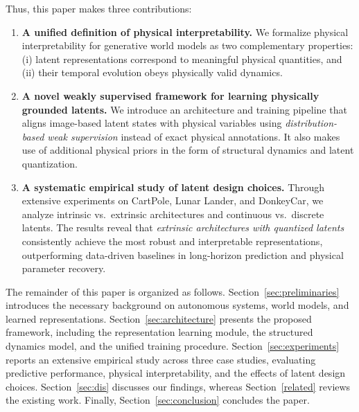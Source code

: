\documentclass[nonacm,sigconf]{acmart}
\begin{document}
Thus, this paper makes three contributions:
\begin{enumerate}
    \item \textbf{A unified definition of physical interpretability.}
    We formalize physical interpretability for generative world models as two complementary properties:
    (i) latent representations correspond to meaningful physical quantities, and
    (ii) their temporal evolution obeys physically valid dynamics.

    \item \textbf{A novel weakly supervised framework for learning physically grounded latents.}
    We introduce an architecture and training pipeline that aligns image-based latent states with physical variables using \emph{distribution-based weak supervision} instead of exact physical annotations. It also makes use of additional physical priors in the form of structural dynamics and latent quantization. %


    \item \textbf{A systematic empirical study of latent design choices.}
    Through extensive experiments on CartPole, Lunar Lander, and DonkeyCar, we analyze intrinsic vs.\ extrinsic architectures and continuous vs.\ discrete latents. The results reveal that \emph{extrinsic architectures with quantized latents} consistently achieve the most robust and interpretable representations, outperforming data-driven baselines in long-horizon prediction and physical parameter recovery.
\end{enumerate}

The remainder of this paper is organized as follows.
Section~\ref{sec:preliminaries} introduces the necessary background on autonomous systems, world models, and learned representations.
Section~\ref{sec:architecture} presents the proposed framework, including the representation learning module, the structured dynamics model, and the unified training procedure.
Section~\ref{sec:experiments} reports an extensive empirical study across three case studies, evaluating predictive performance, physical interpretability, and the effects of latent design choices. Section~\ref{sec:dis} discusses our findings, whereas Section~\ref{related} reviews the existing work.
Finally, Section~\ref{sec:conclusion} concludes the paper. 
\end{document}
